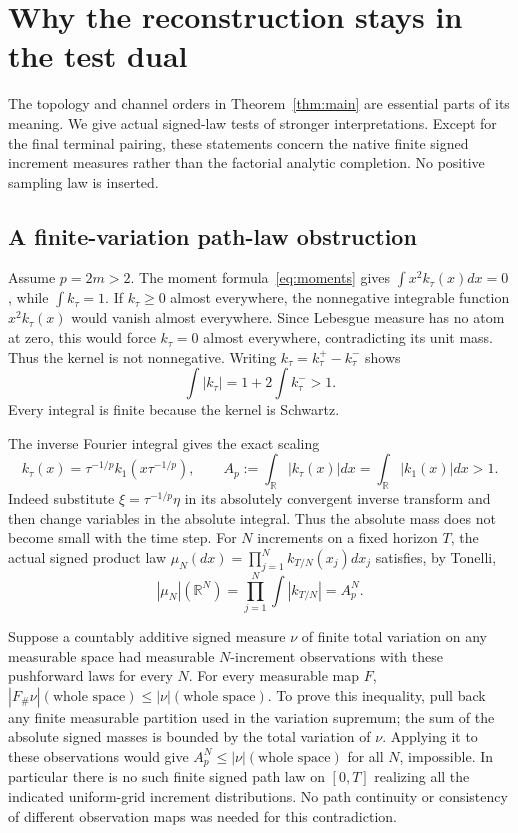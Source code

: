 \documentclass[11pt]{article}
\theoremstyle{remark}\newtheorem{remark}[theorem]{Remark}
\newcommand{\R}{\mathbb R}\newcommand{\N}{\mathbb N}
\begin{document}
\section{Why the reconstruction stays in the test dual}\label{sec:signed-obstructions}
The topology and channel orders in Theorem~\ref{thm:main} are essential
parts of its meaning. We give actual signed-law tests of stronger
interpretations. Except for the final terminal pairing, these statements
concern the native finite signed increment measures rather than the
factorial analytic completion. No positive sampling law is inserted.

\subsection{A finite-variation path-law obstruction}
Assume $p=2m>2$. The moment formula~\eqref{eq:moments} gives
$\int x^2k_\tau(x)dx=0$, while $\int k_\tau=1$.
If $k_\tau\geq0$ almost everywhere, the nonnegative integrable
function $x^2k_\tau(x)$ would vanish almost everywhere. Since
Lebesgue measure has no atom at zero, this would force $k_\tau=0$
almost everywhere, contradicting its unit mass. Thus the kernel is
not nonnegative. Writing $k_\tau=k_\tau^+-k_\tau^-$ shows
\[
 \int|k_\tau|=1+2\int k_\tau^->1.
\]
Every integral is finite because the kernel is Schwartz.

The inverse Fourier integral gives the exact scaling
\begin{equation}\label{eq:signed-scaling}
 k_\tau(x)=\tau^{-1/p}k_1(x\tau^{-1/p}),\qquad
 A_p:=\int_\R|k_\tau(x)|dx=\int_\R|k_1(x)|dx>1.
\end{equation}
Indeed substitute $\xi=\tau^{-1/p}\eta$ in its absolutely convergent
inverse transform and then change variables in the absolute integral.
Thus the absolute mass does not become small with the time step.
For $N$ increments on a fixed horizon $T$, the actual signed product
law $\mu_N(dx)=\prod_{j=1}^Nk_{T/N}(x_j)dx_j$ satisfies, by Tonelli,
\begin{equation}\label{eq:TVproduct}
 |\mu_N|(\R^N)=\prod_{j=1}^N\int|k_{T/N}|=A_p^N.
\end{equation}

Suppose a countably additive signed measure $\nu$ of finite total
variation on any measurable space had measurable $N$-increment
observations with these pushforward laws for every $N$. For every
measurable map $F$, $|F_\#\nu|(\text{whole space})\leq
|\nu|(\text{whole space})$. To prove this inequality, pull back any
finite measurable partition used in the variation supremum; the sum
of the absolute signed masses is bounded by the total variation of
$\nu$. Applying it to these observations would give
$A_p^N\leq|\nu|(\text{whole space})$ for all $N$, impossible.
In particular there is no such finite signed path law on $[0,T]$
realizing all the indicated uniform-grid increment distributions.
No path continuity or consistency of different observation maps was
needed for this contradiction.
\end{document}
